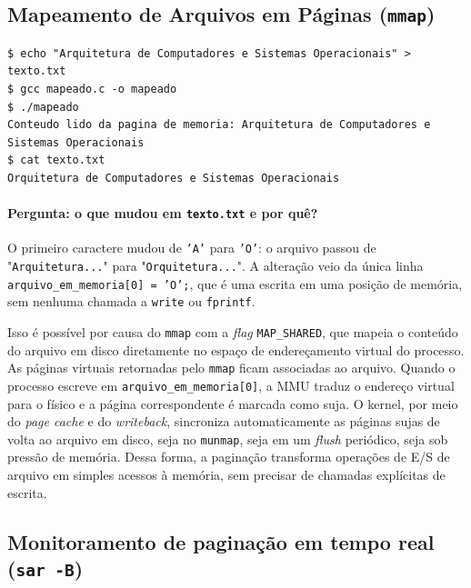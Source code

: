 \documentclass[11pt,a4paper]{article}
\begin{document}
\subsection{Mapeamento de Arquivos em Páginas (\texttt{mmap})}



\begin{lstlisting}[style=bashstyle]
$ echo "Arquitetura de Computadores e Sistemas Operacionais" > texto.txt
$ gcc mapeado.c -o mapeado
$ ./mapeado
Conteudo lido da pagina de memoria: Arquitetura de Computadores e Sistemas Operacionais
$ cat texto.txt
Orquitetura de Computadores e Sistemas Operacionais
\end{lstlisting}

\paragraph{Pergunta: o que mudou em \texttt{texto.txt} e por quê?}
O primeiro caractere mudou de \texttt{'A'} para \texttt{'O'}: o arquivo passou de
"\texttt{Arquitetura...}" para "\texttt{Orquitetura...}". A alteração veio da única linha
\texttt{arquivo\_em\_memoria[0] = 'O';}, que é uma escrita em uma posição de memória, sem nenhuma
chamada a \texttt{write} ou \texttt{fprintf}.

Isso é possível por causa do \texttt{mmap} com a \emph{flag} \texttt{MAP\_SHARED}, que mapeia o
conteúdo do arquivo em disco diretamente no espaço de endereçamento virtual do processo. As páginas
virtuais retornadas pelo \texttt{mmap} ficam associadas ao arquivo. Quando o processo escreve em
\texttt{arquivo\_em\_memoria[0]}, a MMU traduz o endereço virtual para o físico e a página
correspondente é marcada como suja. O kernel, por meio do \emph{page cache} e do \emph{writeback},
sincroniza automaticamente as páginas sujas de volta ao arquivo em disco, seja no \texttt{munmap},
seja em um \emph{flush} periódico, seja sob pressão de memória. Dessa forma, a paginação transforma
operações de E/S de arquivo em simples acessos à memória, sem precisar de chamadas explícitas de
escrita.

\subsection{Monitoramento de paginação em tempo real (\texttt{sar -B})}
\end{document}
